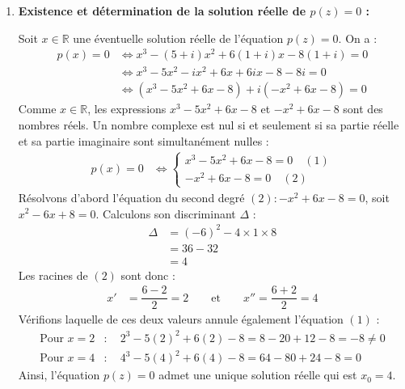\documentclass[12pt,a4paper]{article}
\begin{document}
\begin{enumerate}
    \item \textbf{Existence et détermination de la solution réelle de $p(z) = 0$ :}
    
    Soit $x \in \mathbb{R}$ une éventuelle solution réelle de l'équation $p(z) = 0$. On a :
    $$
    \begin{aligned}
        p(x) = 0 &\iff x^3 - (5 + i)x^2 + 6(1 + i)x - 8(1 + i) = 0 \\
        &\iff x^3 - 5x^2 - ix^2 + 6x + 6ix - 8 - 8i = 0 \\
        &\iff (x^3 - 5x^2 + 6x - 8) + i(-x^2 + 6x - 8) = 0
    \end{aligned}
    $$
    Comme $x \in \mathbb{R}$, les expressions $x^3 - 5x^2 + 6x - 8$ et $-x^2 + 6x - 8$ sont des nombres réels. Un nombre complexe est nul si et seulement si sa partie réelle et sa partie imaginaire sont simultanément nulles :
    $$
    \begin{aligned}
        p(x) = 0 &\iff
        \left\{
        \begin{array}{l}
            x^3 - 5x^2 + 6x - 8 = 0 \quad (1) \\
            -x^2 + 6x - 8 = 0 \quad (2)
        \end{array}
        \right.
    \end{aligned}
    $$
    Résolvons d'abord l'équation du second degré $(2) : -x^2 + 6x - 8 = 0$, soit $x^2 - 6x + 8 = 0$. Calculons son discriminant $\Delta$ :
    $$
    \begin{aligned}
        \Delta &= (-6)^2 - 4 \times 1 \times 8 \\
        &= 36 - 32 \\
        &= 4
    \end{aligned}
    $$
    Les racines de $(2)$ sont donc :
    $$
    \begin{aligned}
        x' &= \dfrac{6 - 2}{2} = 2 \qquad \text{et} \qquad x'' = \dfrac{6 + 2}{2} = 4
    \end{aligned}
    $$
    Vérifions laquelle de ces deux valeurs annule également l'équation $(1)$ :
    $$
    \begin{aligned}
        \text{Pour } x = 2 &: \quad 2^3 - 5(2)^2 + 6(2) - 8 = 8 - 20 + 12 - 8 = -8 \neq 0 \\
        \text{Pour } x = 4 &: \quad 4^3 - 5(4)^2 + 6(4) - 8 = 64 - 80 + 24 - 8 = 0
    \end{aligned}
    $$
    Ainsi, l'équation $p(z) = 0$ admet une unique solution réelle qui est $x_0 = 4$.


\end{enumerate}
\end{document}
